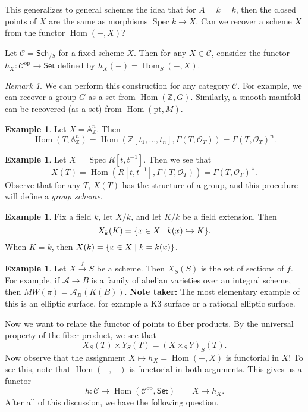\documentclass[leqno, openany]{memoir}
\theoremstyle{definition}
\newtheorem{exm}[thm]{Example}
\theoremstyle{remark}
\newtheorem{rmk}[thm]{Remark}
\theoremstyle{plain}
\theoremstyle{definition}
\theoremstyle{remark}
\newcommand{\A}{\mathbb{A}}
\newcommand{\Z}{\mathbb{Z}}
\newcommand{\mc}[1]{\mathcal{#1}}
\newcommand{\mr}[1]{\mathrm{#1}}
\newcommand{\ms}[1]{\mathsf{#1}}
\newcommand{\ol}[1]{\overline{#1}}
\newcommand{\pt}{\mathrm{pt}}
\renewcommand{\op}{\mathrm{op}}
\DeclareMathOperator{\Hom}{Hom}
\DeclareMathOperator{\Spec}{Spec}
\begin{document}
This generalizes to general schemes the idea that for $A = k = \ol{k}$, then
the closed points of $X$ are the same as morphisms $\Spec k \to X$. Can we
recover a scheme $X$ from the functor $\Hom(-,X)$?

Let $\mc{C} = \ms{Sch}_{/S}$ for a fixed scheme $X$. Then for any $X \in
\mc{C}$, consider the functor $h_X \colon \mc{C}^{\mr{op}} \to \ms{Set}$
defined by $h_X(-) = \Hom_S(-,X)$.

\begin{rmk} We can perform this construction for any category $\mc{C}$. For
example, we can recover a group $G$ as a set from $\Hom(\Z, G)$. Similarly, a
smooth manifold can be recovered (as a set) from $\Hom(\pt, M)$.  \end{rmk}

\begin{exm} Let $X = \A^n_{\Z}$. Then \[ \Hom(T, \A^n_{\Z}) = \Hom(\Z[t_1,
\ldots, t_n], \Gamma(T, \mc{O}_T)) = {\Gamma(T, \mc{O}_T)}^n. \] \end{exm}

\begin{exm} Let $X = \Spec R[t,t^{-1}]$. Then we see that \[ X(T) =
\Hom(R[t,t^{-1}], \Gamma(T, \mc{O}_T)) = {\Gamma(T, \mc{O}_T)}^{\times}. \]
Observe that for any $T$, $X(T)$ has the structure of a group, and this
procedure will define a \textit{group scheme}.  \end{exm}

\begin{exm} Fix a field $k$, let $X/k$, and let $K/k$ be a field extension.
    Then \[ X_k(K) = \qty{x \in X \mid k(x) \hookrightarrow K}. \] When $K =
k$, then $X(k) = \qty{x \in X \mid k = k(x)}$.  \end{exm}

\begin{exm} Let $X \xrightarrow{f} S$ be a scheme. Then $X_S(S)$ is the set of
    sections of $f$. For example, if $\mc{A} \to B$ is a family of abelian
    varieties over an integral scheme, then $MW(\pi) = \mc{A}_B(K(B))$.
    \textbf{Note taker:} The most elementary example of this is an elliptic
    surface, for example a K3 surface or a rational elliptic surface.
\end{exm}

Now we want to relate the functor of points to fiber products. By the universal
property of the fiber product, we see that \[ X_S(T) \times Y_S(T) = {(X
\times_S Y)}_S(T).\] Now observe that the assignment $X \mapsto h_X =
\Hom(-,X)$ is functorial in $X$! To see this, note that $\Hom(-,-)$ is
functorial in both arguments. This gives us a functor \[ h \colon \mc{C} \to
\Hom(\mc{C}^{\op}, \ms{Set}) \qquad X \mapsto h_X. \] After all of this
discussion, we have the following question.
\end{document}
